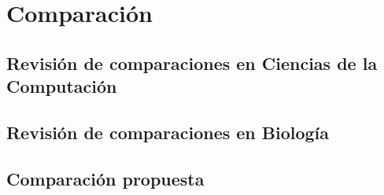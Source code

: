 \chapter{Comparación}
\label{ch:results}

\section{Revisión de comparaciones en Ciencias de la Computación}



\section{Revisión de comparaciones en Biología}

\section{Comparación propuesta}